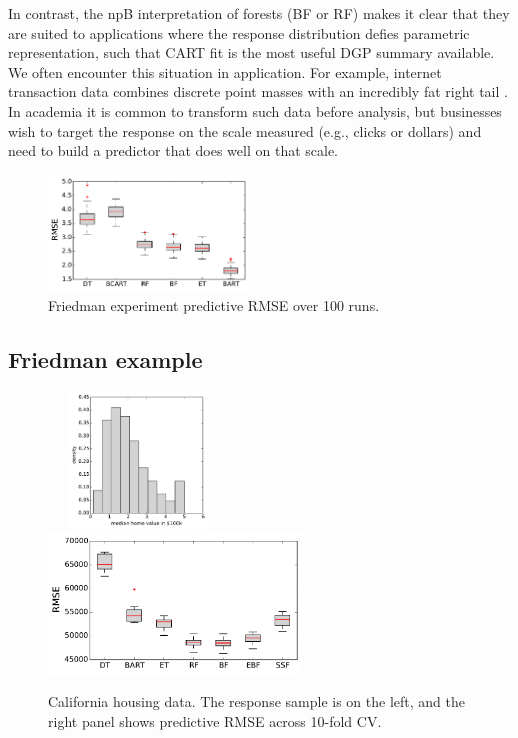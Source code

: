 \documentclass{article}
\begin{document}
In contrast, the npB interpretation of
forests (BF or RF)  makes it clear that they are suited to applications where
the response distribution defies parametric representation, such that CART fit
is the most useful DGP summary available. We  often encounter this situation in
application.  For example,  internet transaction data  combines discrete
point masses  with  an incredibly fat right tail \citep[e.g.,
see][]{taddy_heterogeneous_2014}.  In academia it is common to transform such
data before analysis, but businesses wish to target the response on the scale
measured (e.g., clicks or dollars) and  need to build a predictor that does
well on that scale.


\begin{figure}
\includegraphics[width=0.475\textwidth]{../graphs/fried}
\caption{Friedman experiment predictive RMSE over 100 runs.}
\end{figure}


\subsection{Friedman example}\label{friedman-example}


\begin{figure}
~~~\includegraphics[width=0.325\textwidth]{../graphs/ca_hist}
~~~~~~~
\includegraphics[width=0.6\textwidth]{../graphs/ca_rmse}
\caption{\label{calihist} California housing data. The response sample is on the left, and the right panel shows predictive RMSE across 10-fold CV.}
\end{figure}
    
\end{document}
